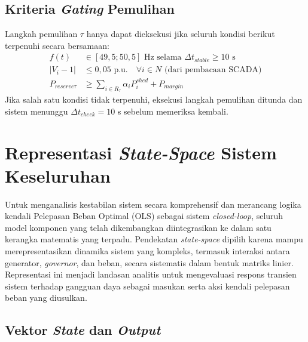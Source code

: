 \subsection{Kriteria \textit{Gating} Pemulihan}
\label{subsec:Kriteria_Gating_Pemulihan}

Langkah pemulihan $\tau$ hanya dapat dieksekusi jika seluruh kondisi berikut terpenuhi secara bersamaan:
\begin{equation}
    \begin{aligned}
        f(t) &\in [49,5; 50,5] \text{ Hz selama } \Delta t_{stable} \ge 10 \text{ s} \\
        |V_{i}-1| &\le 0,05 \text{ p.u.} \quad \forall i\in N \text{ (dari pembacaan SCADA)} \\
        P_{reserve\tau} &\ge \sum_{i\in R_{\tau}} \alpha_{i} P_{i}^{shed} + P_{margin}
    \end{aligned}
\end{equation}
Jika salah satu kondisi tidak terpenuhi, eksekusi langkah pemulihan ditunda dan sistem menunggu $\Delta t_{check} = 10$ s sebelum memeriksa kembali.

\section{Representasi \textit{State-Space} Sistem Keseluruhan}
\label{sec:Representasi_State_Space_Sistem}

Untuk menganalisis kestabilan sistem secara komprehensif dan merancang logika kendali Pelepasan Beban Optimal (OLS) sebagai sistem \textit{closed-loop}, seluruh model komponen yang telah dikembangkan diintegrasikan ke dalam satu kerangka matematis yang terpadu. Pendekatan \textit{state-space} dipilih karena mampu merepresentasikan dinamika sistem yang kompleks, termasuk interaksi antara generator, \textit{governor}, dan beban, secara sistematis dalam bentuk matriks linier. Representasi ini menjadi landasan analitis untuk mengevaluasi respons transien sistem terhadap gangguan daya sebagai masukan serta aksi kendali pelepasan beban yang diusulkan.

\subsection{Vektor \textit{State} dan \textit{Output}}
\label{subsec:Vektor_State_dan_Output}


